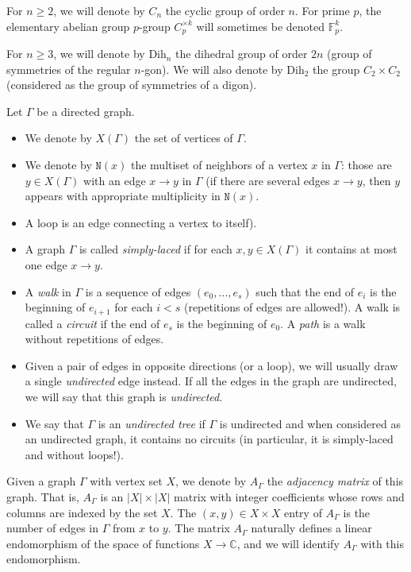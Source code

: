 \documentclass[ALCO]{cedram}
\newcommand{\C}{{\mathbb C}}
\newcommand{\abs}[1]{\left|{#1}\right|}
\begin{document}
\begin{nota}
 {For $n\geq 2$, we will denote by $C_n$ the cyclic group of order $n$. For prime $p$, the elementary abelian group $p$-group $C_p^{\times k}$ will sometimes be denoted $\mathbb{F}_p^k$.}
\end{nota}

\begin{nota}
 {For $n\geq 3$,} we will denote by $\mathrm{Dih}_n$ the dihedral group of order $2n$ (group of symmetries of the regular $n$-gon). {We will also denote by $\mathrm{Dih}_2$ the group $C_2 \times C_2$ (considered as the group of symmetries of a digon).}
\end{nota}

\begin{nota}
 Let $\Gamma$ be a directed graph.  
 \begin{itemize}
 \item We denote by $X(\Gamma)$ the set of vertices of $\Gamma$. 
 \item We denote by $\mathtt{N}(x)$ the multiset of neighbors of a vertex $x$ in $\Gamma$: those are $y\in X(\Gamma)$ with an edge $x\to y$ in $\Gamma$ (if there are several edges $x \to y$, then $y$ appears with appropriate multiplicity in $\mathtt{N}(x)$.
 \item A loop is an edge connecting a vertex to itself). 
 \item A graph $\Gamma$ is called {\it simply-laced} if for each $x, y \in X(\Gamma)$ it contains at most one edge $x \to y$.
 \item A {\it walk} in $\Gamma$ is a sequence of edges $(e_0, \ldots, e_s)$ such that the end of $e_i$ is the beginning of $e_{i+1}$ for each $i<s$ (repetitions of edges are allowed!). A walk is called a {\it circuit} if the end of $e_s$ is the beginning of $e_{0}$. A {\it path} is a walk without repetitions of edges.
 \item Given a pair of edges in opposite directions (or a loop), we will usually draw a single {\it undirected} edge instead. If all the edges in the graph are undirected, we will say that this graph is {\it undirected}. 
 \item We say that $\Gamma$ is an {\it undirected tree} if $\Gamma$ is undirected and when considered as an undirected graph, it contains no circuits (in particular, it is simply-laced and without loops!).
 \end{itemize}
 
\end{nota}
\begin{nota}
 Given a graph $\Gamma$ with vertex set $X$, we denote by $A_{\Gamma}$ the {\it adjacency matrix} of this graph. That is, $A_{\Gamma}$ is an $\abs{X} \times \abs{X}$ matrix with integer coefficients whose rows and columns are indexed by the set $X$. The $(x,y) \in X \times X$ entry of $A_{\Gamma}$ is the number of edges in $\Gamma$ from $x$ to $y$. The matrix $A_{\Gamma}$ naturally defines a linear endomorphism of the space of functions $X \to \C$, and we will identify $A_{\Gamma}$ with this endomorphism. 
\end{nota}
\end{document}
